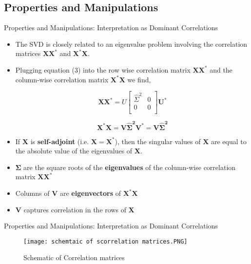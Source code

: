 \documentclass[9pt]{beamer}
\begin{document}

\subsection{Properties and Manipulations}
\begin{frame}{Properties and Manipulations: Interpretation as Dominant Correlations}
    \begin{itemize}
        \item The SVD is closely related to an eigenvalue problem involving the correlation matrices $\mathbf{XX^{*}}$ and $\mathbf{X^{*}X}$.
        \item Plugging equation (3) into the row wise correlation matrix $\mathbf{XX^{*}}$ and the column-wise correlation matrix $\mathbf{X^{*}X}$ we find, 
        
        \begin{equation}
            \mathbf{XX^{*}} = U \begin{bmatrix}
                \hat{\Sigma}^{2} & 0 \\
                0 & 0 \\
            \end{bmatrix}
            \mathbf{U^{*}}
        \end{equation}
        
        \begin{equation}
            \mathbf{X^{*}X} = \mathbf{V\hat{\Sigma}^{2} V^{*}} = \mathbf{V\hat{\Sigma}^{2}}
        \end{equation}
        
        \item If $\mathbf{X}$ is \textbf{self-adjoint} (i.e. $\mathbf{X} = \mathbf{X}^{*}$), then the singular values of $\mathbf{X}$ are equal to the absolute value of the eigenvalues of $\mathbf{X}$.
        \item $\mathbf{\Sigma}$ are the square roots of the \textbf{eigenvalues} of the column-wise correlation matrix $\mathbf{XX^{*}}$ 
        \item Columns of $\mathbf{V}$ are \textbf{eigenvectors} of $\mathbf{X^{*}X}$
        \item $\mathbf{V}$ captures correlation in the rows of $\mathbf{X}$
    \end{itemize}
\end{frame}

\begin{frame}{Properties and Manipulations: Interpretation as Dominant Correlations}
        \begin{figure}
        \texttt{[image: schemtaic of scorrelation matrices.PNG]}
        \caption{Schematic of Correlation matrices}
    \end{figure}
\end{frame}
\end{document}
